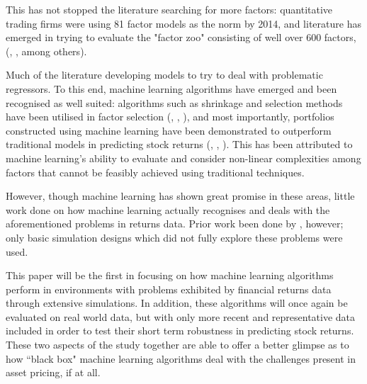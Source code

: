 \documentclass[a4paper]{article}
\begin{document}
	This has not stopped the literature searching for more factors: quantitative trading firms were using 81 factor models as the norm \citep{hsu_finding_2014} by 2014, and literature has emerged in trying to evaluate the "factor zoo" consisting of well over 600 factors, (\cite{harvey__2016}, \cite{harvey_census_2019}, among others).
	
	Much of the literature developing models to try to deal with problematic regressors. To this end, machine learning algorithms have emerged and been recognised as well suited: algorithms such as shrinkage and selection methods have been utilised in factor selection (\cite{kozak_shrinking_2017}, \cite{rapach_forecasting_2013}, \cite{freyberger_dissecting_2017}), and most importantly, portfolios constructed using machine learning have been demonstrated to outperform traditional models in predicting stock returns (\cite{gu_empirical_2018}, \cite{hsu_finding_2014}, \cite{feng_deep_2018}). This has been attributed to machine learning's ability to evaluate and consider non-linear complexities among factors that cannot be feasibly achieved using traditional techniques.  
	
	However, though machine learning has shown great promise in these areas, little work done on how machine learning actually recognises and deals with the aforementioned problems in returns data. Prior work been done by \cite{gu_empirical_2018}, however; only basic simulation designs which did not fully explore these problems were used.
	
	This paper will be the first in focusing on how machine learning algorithms perform in environments with problems exhibited by financial returns data through extensive simulations. In addition, these algorithms will once again be evaluated on real world data, but with only more recent and representative data included in order to test their short term robustness in predicting stock returns. These two aspects of the study together are able to offer a better glimpse as to how ``black box" machine learning algorithms deal with the challenges present in asset pricing, if at all.
	
	
	
\end{document}
